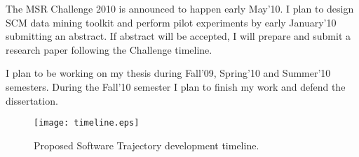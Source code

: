 The MSR Challenge 2010 is announced to happen early May'10. I plan to design SCM data mining toolkit and perform pilot experiments by early January'10 submitting an abstract. If abstract will be accepted, I will prepare and submit a research paper following the Challenge timeline.

I plan to be working on my thesis during Fall'09, Spring'10 and Summer'10 semesters. During the Fall'10 semester I plan to finish my work and defend the dissertation.

\begin{figure}[tbp]
   \centering
   \texttt{[image: timeline.eps]}
   \caption{Proposed Software Trajectory development timeline.}
   \label{fig:timeline}
\end{figure}